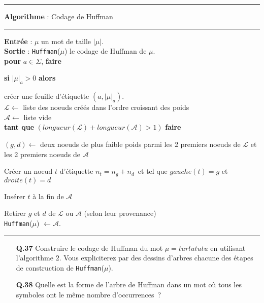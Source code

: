 \documentclass[11pt,a4paper]{article}\nofiles
\begin{document}
\hrule \vskip1mm
\textbf{Algorithme} : Codage de Huffman
\vskip1mm
\hrule
\vskip1mm
\textbf{Entr\'ee} : $\mu$ un mot de taille $|\mu|$.\\
\textbf{Sortie} : \texttt{Huffman}($\mu$) le codage de Huffman de $\mu$.\\
\textbf{pour} $a\in \Sigma$, \textbf{faire}\par
\hspace{7mm} \textbf{si} $|\mu|_a>0$ \textbf{alors}\par
\hspace{14mm} cr\'eer une feuille d'\'etiquette $(a,|\mu|_a)$.\\
$\mathcal{L} \leftarrow$ liste des noeuds cr\'e\'es dans l'ordre croissant des poids\\
$\mathcal{A} \leftarrow$ liste vide\\
\textbf{tant que} $(longueur (\mathcal{L})+longueur (\mathcal{A})>1)$ \textbf{faire}\par
\hspace{7mm} \begin{minipage}{12cm}$(g,d)\leftarrow$ deux noeuds de plus faible poids parmi les 2 premiers noeuds de $\mathcal{L}$ et les 2 premiers noeuds de $\mathcal{A}$\end{minipage}\par
\hspace{7mm} \begin{minipage}{12cm} Cr\'eer un noeud $t$ d'\'etiquette $n_t=n_g+n_d$\ et tel que $gauche(t)=g$ et $droite(t)= d$\end{minipage}\par
\hspace{7mm} Ins\'erer $t$ \`a la fin de $\mathcal{A}$\par
\hspace{7mm} Retirer $g$ et $d$ de $\mathcal{L}$ ou $\mathcal{A}$ (selon leur provenance)\\
\texttt{Huffman}($\mu$) $ \leftarrow \mathcal{A}$.\\
\vskip1mm
\hrule
\begin{enumerate}
\item[{\bf Q.37}] Construire le codage de Huffman du mot $\mu=turlututu$ en utilisant l'algorithme $2$. Vous expliciterez par des dessins d'arbres chacune des \'etapes de construction de \texttt{Huffman}($\mu$).
\item[{\bf Q.38}] Quelle est la forme de l'arbre de Huffman dans un mot o\`u tous les symboles ont le m\^eme nombre d'occurrences~?
\end{enumerate}
\end{document}
